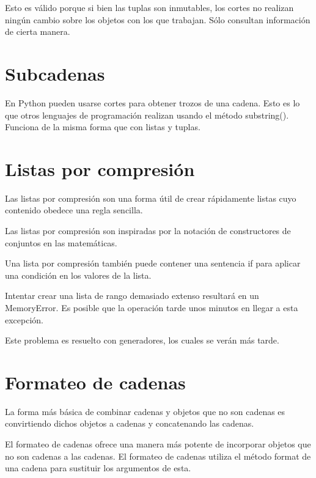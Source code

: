 \documentclass{report}
\begin{document}
{

Esto es válido porque si bien las tuplas son inmutables, los cortes no realizan ningún cambio sobre los objetos con los que trabajan. Sólo consultan información de cierta manera.

\section{Subcadenas}

En Python pueden usarse cortes para obtener trozos de una cadena. Esto es lo que otros lenguajes de programación realizan usando el método substring(). Funciona de la misma forma que con listas y tuplas.


\section{Listas por compresión}

Las listas por compresión son una forma útil de crear rápidamente listas cuyo contenido obedece una regla sencilla.


Las listas por compresión son inspiradas por la notación de constructores de conjuntos en las matemáticas.

Una lista por compresión también puede contener una sentencia if para aplicar una condición en los valores de la lista.


Intentar crear una lista de rango demasiado extenso resultará en un MemoryError. Es posible que la operación tarde unos minutos en llegar a esta excepción.


Este problema es resuelto con generadores, los cuales se verán más tarde.

\section{Formateo de cadenas}

La forma más básica de combinar cadenas y objetos que no son cadenas es convirtiendo dichos objetos a cadenas y concatenando las cadenas.

El formateo de cadenas ofrece una manera más potente de incorporar objetos que no son cadenas a las cadenas. El formateo de cadenas utiliza el método format de una cadena para sustituir los argumentos de esta.

}
\end{document}
